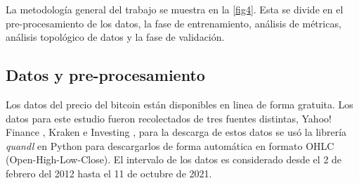 La metodología general del trabajo se muestra en la \autoref{fig4}. Esta se divide en el pre-procesamiento de los datos, la fase de entrenamiento, análisis de métricas, análisis topológico de datos y la fase de validación. 

\subsection{Datos y pre-procesamiento}

Los datos del precio del bitcoin están disponibles en linea de forma gratuita. Los datos para este estudio fueron recolectados de tres fuentes distintas, Yahoo! Finance \cite{YahooFinanceStock}, Kraken \cite{BitcoinCryptocurrencyExchange} e Investing \cite{InvestingComStock}, para la descarga de estos datos se usó la librería \emph{quandl} en Python para descargarlos de forma automática en formato OHLC (Open-High-Low-Close). El intervalo de los datos es considerado desde el 2 de febrero del 2012 hasta el 11 de octubre de 2021.

